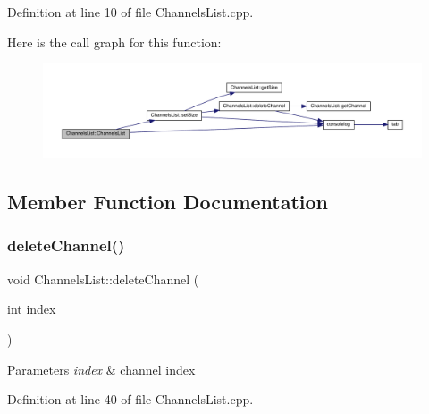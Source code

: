 Definition at line 10 of file Channels\+List.\+cpp.

Here is the call graph for this function\+:
\nopagebreak
\begin{figure}[H]
\begin{center}
\leavevmode
\includegraphics[width=350pt]{class_channels_list_a2be2b5b850d9841fc90208afc7c6f112_cgraph}
\end{center}
\end{figure}


\subsection{Member Function Documentation}
\mbox{\label{class_channels_list_a72dfd281e40fd29624354254ad3fa791}} 
\subsubsection{\texorpdfstring{delete\+Channel()}{deleteChannel()}}
{\footnotesize\ttfamily void Channels\+List\+::delete\+Channel (\begin{DoxyParamCaption}\item[{int}]{index }\end{DoxyParamCaption})}


\begin{DoxyParams}{Parameters}
{\em index} & channel index \\
\hline
\end{DoxyParams}


Definition at line 40 of file Channels\+List.\+cpp.

